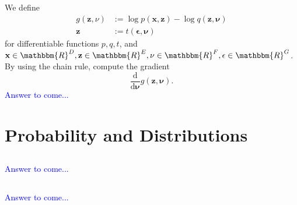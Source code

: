 \documentclass[a4paper,12pt]{article}
\newcommand{\R}{\mathbbm{R}}
\newcommand{\vecx}{\textbf{x}}
\newcommand{\vecz}{\textbf{z}}
\begin{document}
\subsection{}
We define 
\begin{align*}
g(\vecz, 
\textbf{$\nu$}) 
&:= 
\log p(\vecx, \vecz) - \log q(\vecz, \mathbf{\nu}) \\
\vecz 
&:= 
t(\mathbf{\epsilon}, \mathbf{\nu})
\end{align*}
for differentiable functions $p,q,t$, and $\vecx \in \R^D, \vecz \in \R^E, \mathbf{\nu} \in \R ^F, \mathbf{\epsilon} \in \R^G$. By using the chain rule, compute the gradient $$\dfrac{\textrm{d}}{\textrm{d} \mathbf{\nu}} g(\vecz, \mathbf{\nu}).$$
\textcolor{blue}{
Answer to come...
}
\newpage%
\section{Probability and Distributions}
\subsection{}

\textcolor{blue}{
Answer to come...
}
\subsection{}

\textcolor{blue}{
Answer to come...
}
\subsection{}
\end{document}
